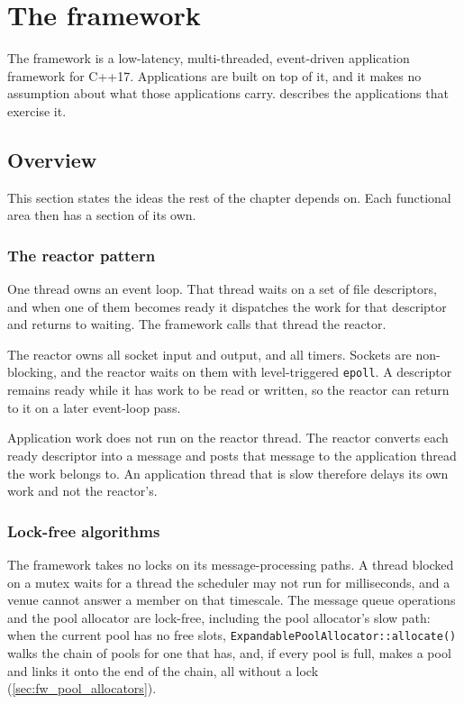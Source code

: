 \chapter{The framework}
\label{ch:library}

The framework is a low-latency, multi-threaded, event-driven application
framework for C++17. Applications are built on top of it, and it makes no
assumption about what those applications carry. 
describes the applications that exercise it.

\section{Overview}
\label{sec:fw_overview}

This section states the ideas the rest of the chapter depends on. Each
functional area then has a section of its own.

\subsection{The reactor pattern}
\label{sec:fw_reactor_pattern}

One thread owns an event loop. That thread waits on a set of file descriptors,
and when one of them becomes ready it dispatches the work for that descriptor
and returns to waiting. The framework calls that thread the reactor.

The reactor owns all socket input and output, and all timers. Sockets are
non-blocking, and the reactor waits on them with level-triggered
\texttt{epoll}. A descriptor remains ready while it has work to be read or
written, so the reactor can return to it on a later event-loop pass.

Application work does not run on the reactor thread. The reactor converts each
ready descriptor into a message and posts that message to the application
thread the work belongs to. An application thread that is slow therefore delays
its own work and not the reactor's.

\subsection{Lock-free algorithms}
\label{sec:fw_lock_free}

The framework takes no locks on its message-processing paths. A thread blocked
on a mutex waits for a thread the scheduler may not run for milliseconds, and a
venue cannot answer a member on that timescale. The message queue operations
and the pool allocator are lock-free, including the pool allocator's slow path:
when the current pool has no free slots,
\texttt{ExpandablePoolAllocator::allocate()} walks the chain of pools for one
that has, and, if every pool is full, makes a pool and links it onto the end of
the chain, all without a lock (\cref{sec:fw_pool_allocators}).

